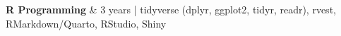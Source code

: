 \textbf{R Programming} & 
3 years | 
tidyverse (dplyr, ggplot2, tidyr, readr), 
rvest, 
RMarkdown/Quarto, 
RStudio, 
Shiny 
